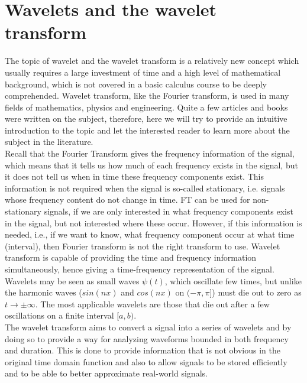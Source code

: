 \documentclass[12pt,english]{report}
\begin{document}
\chapter{Wavelets and the wavelet transform}

The topic of wavelet and the wavelet transform is a relatively new concept which usually requires a large investment of time and a high level of mathematical background, which is not covered in a basic calculus course to be deeply comprehended.
Wavelet transform, like the Fourier transform, is used in many fields of mathematics, physics and engineering. Quite a few articles and books were written on the subject, therefore, here we will try to provide an intuitive introduction to the topic and let the interested reader to learn more about the subject in the literature. \\ 

Recall that the Fourier Transform gives the frequency information of the signal, which means that it tells us how much of each frequency exists in the signal, but it does not tell us when in time these frequency components exist. This information is not required when the signal is so-called stationary, i.e. signals whose frequency content do not change in time. FT can be used for non-stationary signals, if we are only interested in what frequency components exist in the signal, but not interested where these occur. However, if this information is needed, i.e., if we want to know, what frequency component occur at what time (interval), then Fourier transform is not the right transform to use. Wavelet transform is capable of providing the time and frequency information simultaneously, hence giving a time-frequency representation of the signal.\\

Wavelets may be seen as small waves $\psi(t)$, which oscillate few times, but unlike the harmonic waves ($sin(nx)$ and $cos(nx)$ on $(-\pi,\pi]$) must die out to zero as $t \rightarrow \pm\infty$. The most applicable wavelets are those that die out after a few oscillations on a finite interval $[a,b)$. \\

The wavelet transform aims to convert a signal into a series of wavelets and by doing so to provide a way for analyzing waveforms bounded in both frequency and duration. This is done to provide information that is not obvious in the original time domain function and also to allow signals to be stored efficiently and to be able to better approximate real-world signals. \\
\end{document}
